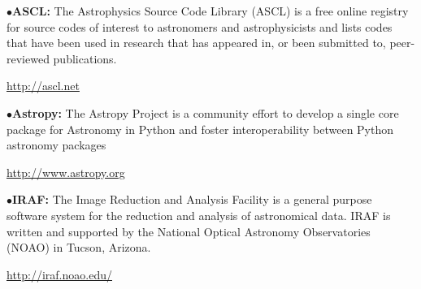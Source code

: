





\medskip
\medskip

%

\medskip

\item{$\bullet$}{\bf ASCL:} 
The Astrophysics Source Code Library (ASCL) is a free online registry for source codes of interest to astronomers and astrophysicists and lists codes that have been used in research that has appeared in, or been submitted to, peer-reviewed publications. 
	\item{}\qquad\url{http://ascl.net}

\medskip

\item{$\bullet$}{\bf Astropy:} 
The Astropy Project is a community effort to develop a single core package for Astronomy in Python and foster interoperability between Python astronomy packages
	\item{}\qquad\url{http://www.astropy.org}

\medskip

\item{$\bullet$}{\bf IRAF:} 
The Image Reduction and Analysis Facility is a general purpose software system for the reduction and analysis of astronomical data. IRAF is written and supported by the National Optical Astronomy Observatories (NOAO) in Tucson, Arizona.
	\item{}\qquad\url{http://iraf.noao.edu/}

